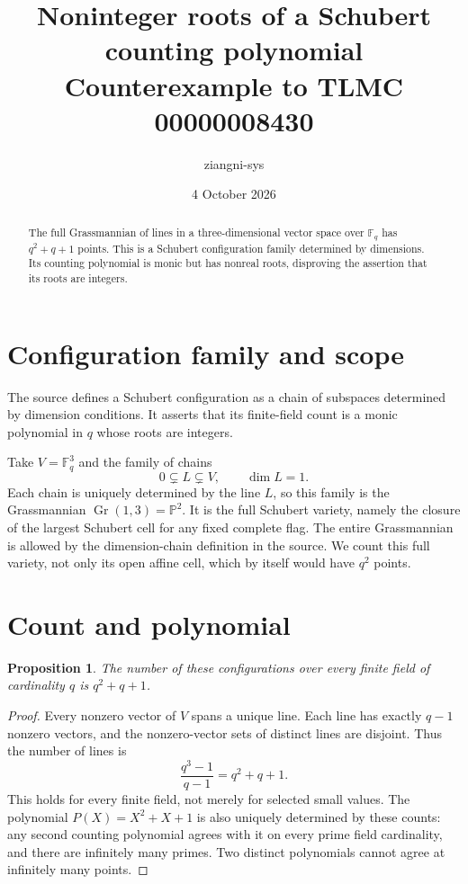 \documentclass[11pt]{article}
\title{Noninteger roots of a Schubert counting polynomial\\\large Counterexample to TLMC 00000008430}
\author{ziangni-sys}
\date{4 October 2026}
\newtheorem{proposition}{Proposition}
\begin{document}
\maketitle
\begin{abstract}
The full Grassmannian of lines in a three-dimensional vector space over
$\mathbb F_q$ has $q^2+q+1$ points. This is a Schubert configuration
family determined by dimensions. Its counting polynomial is monic but
has nonreal roots, disproving the assertion that its roots are integers.
\end{abstract}

\section{Configuration family and scope}
The source defines a Schubert configuration as a chain of subspaces
determined by dimension conditions. It asserts that its finite-field
count is a monic polynomial in $q$ whose roots are integers.

Take $V=\mathbb F_q^3$ and the family of chains
\[
 0\subsetneq L\subsetneq V,\qquad \dim L=1.
\]
Each chain is uniquely determined by the line $L$, so this family is
the Grassmannian $\operatorname{Gr}(1,3)=\mathbb P^2$. It is the full
Schubert variety, namely the closure of the largest Schubert cell for
any fixed complete flag. The entire Grassmannian is allowed by the
dimension-chain definition in the source. We count this full variety,
not only its open affine cell, which by itself would have $q^2$ points.

\section{Count and polynomial}
\begin{proposition}
The number of these configurations over every finite field of cardinality
$q$ is $q^2+q+1$.
\end{proposition}
\begin{proof}
Every nonzero vector of $V$ spans a unique line. Each line has exactly
$q-1$ nonzero vectors, and the nonzero-vector sets of distinct lines
are disjoint. Thus the number of lines is
\[
 \frac{q^3-1}{q-1}=q^2+q+1.
\]
This holds for every finite field, not merely for selected small values.
The polynomial $P(X)=X^2+X+1$ is also uniquely determined by these
counts: any second counting polynomial agrees with it on every prime
field cardinality, and there are infinitely many primes. Two distinct
polynomials cannot agree at infinitely many points.
\end{proof}
\end{document}
